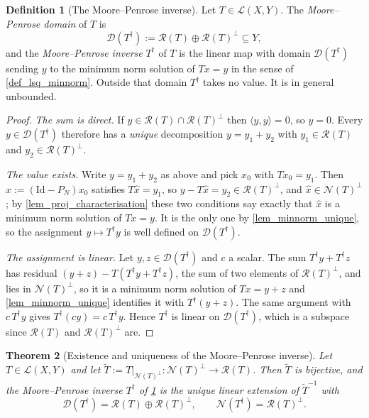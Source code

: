 \documentclass[a4paper]{report}
\theoremstyle{plain}
\newtheorem{theorem}{Theorem}[chapter]
\theoremstyle{definition}
\newtheorem{definition}[theorem]{Definition}
\theoremstyle{remark}
\newcommand{\Ll}{\mathcal{L}}
\newcommand{\Ran}{\mathcal{R}}
\newcommand{\Ker}{\mathcal{N}}
\newcommand{\Dom}{\mathcal{D}}
\newcommand{\Id}{\mathrm{Id}}
\newcommand{\dg}{^{\dagger}}
\begin{document}
\begin{definition}[The Moore--Penrose inverse]
  \label{def_moore_penrose}
  Let $T \in \Ll(X,Y)$.  The \emph{Moore--Penrose domain} of $T$ is
  \[
    \Dom(T\dg) := \Ran(T) \oplus \Ran(T)^{\perp} \subseteq Y ,
  \]
  and the \emph{Moore--Penrose inverse} $T\dg$ of $T$ is the linear map with domain
  $\Dom(T\dg)$ sending $y$ to the minimum norm solution of $Tx = y$ in the sense of
  \cref{def_lsq_minnorm}.  Outside that domain $T\dg$ takes no value.  It is in general
  unbounded.
\end{definition}

\begin{proof}
  \emph{The sum is direct.}  If $y \in \Ran(T) \cap \Ran(T)^{\perp}$ then
  $\langle y,y\rangle = 0$, so $y = 0$.  Every $y \in \Dom(T\dg)$ therefore has a
  \emph{unique} decomposition $y = y_1 + y_2$ with $y_1 \in \Ran(T)$ and
  $y_2 \in \Ran(T)^{\perp}$.

  \emph{The value exists.}  Write $y = y_1 + y_2$ as above and pick $x_0$ with
  $Tx_0 = y_1$.  Then $\hat{x} := (\Id - P_N)x_0$ satisfies $T\hat{x} = y_1$, so
  $y - T\hat{x} = y_2 \in \Ran(T)^{\perp}$, and $\hat{x} \in \Ker(T)^{\perp}$; by
  \cref{lem_proj_characterisation} these two conditions say exactly that $\hat{x}$ is a
  minimum norm solution of $Tx = y$.  It is the only one by
  \cref{lem_minnorm_unique}, so the assignment $y \mapsto T\dg y$ is well defined on
  $\Dom(T\dg)$.

  \emph{The assignment is linear.}  Let $y, z \in \Dom(T\dg)$ and $c$ a scalar.  The sum
  $T\dg y + T\dg z$ has residual $(y + z) - T(T\dg y + T\dg z)$, the sum of two elements of
  $\Ran(T)^{\perp}$, and lies in $\Ker(T)^{\perp}$, so it is a minimum norm solution of
  $Tx = y + z$ and \cref{lem_minnorm_unique} identifies it with $T\dg(y+z)$.  The same
  argument with $c\,T\dg y$ gives $T\dg(cy) = c\,T\dg y$.  Hence $T\dg$ is linear on
  $\Dom(T\dg)$, which is a subspace since $\Ran(T)$ and $\Ran(T)^{\perp}$ are.
\end{proof}


\begin{theorem}[Existence and uniqueness of the Moore--Penrose inverse]
  \label{thm_mp_inverse}
  Let $T \in \Ll(X,Y)$ and let $\tilde{T} := T|_{\Ker(T)^{\perp}} \colon \Ker(T)^{\perp}
  \to \Ran(T)$.  Then $\tilde{T}$ is bijective, and the Moore--Penrose inverse $T\dg$ of
  \cref{def_moore_penrose} is the unique linear extension of $\tilde{T}^{-1}$ with
  \[
    \Dom(T\dg) = \Ran(T) \oplus \Ran(T)^{\perp},
    \qquad
    \Ker(T\dg) = \Ran(T)^{\perp}.
  \]
\end{theorem}
\end{document}
